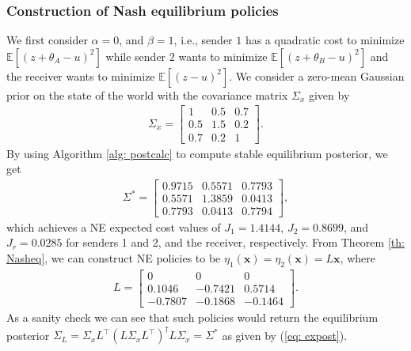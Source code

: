 \documentclass[12pt,journal,onecolumn]{IEEEtran}
\begin{document}
\subsubsection{Construction of Nash equilibrium policies}
We first consider $\alpha=0$, and $\beta=1$, i.e., sender $1$ has a quadratic cost to minimize $\mathbb{E}[(z+\theta_A-u)^2]$ while sender $2$ wants to minimize $\mathbb{E}[(z+\theta_B-u)^2]$ and the receiver wants to minimize $\mathbb{E}[(z-u)^2]$. We consider a zero-mean Gaussian prior on the state of the world with the covariance matrix $\Sigma_x$ given by
\begin{align}
    \Sigma_x=\begin{bmatrix}1 &0.5 &0.7\\0.5 &1.5 &0.2\\ 0.7 &0.2 &1\end{bmatrix}.
\end{align}
By using Algorithm \ref{alg: postcalc} to compute stable equilibrium posterior, we get 
\begin{align}\label{eq: expost}
\Sigma^*=\begin{bmatrix}
    0.9715  &  0.5571 &   0.7793\\
    0.5571  &  1.3859    &0.0413\\
    0.7793  &  0.0413   & 0.7794
   \end{bmatrix},
\end{align}
which achieves a NE expected cost values of $J_1=1.4144$, $J_2=0.8699$, and $ J_r=0.0285$ for senders 1 and 2, and the receiver, respectively. 
From Theorem \ref{th: Nasheq}, we can construct NE policies to be $\eta_1(\boldsymbol{x})=\eta_2(\boldsymbol{x})=L\boldsymbol{x}$, where 
\begin{align*}
L=\begin{bmatrix}
   0&   0  &  0\\
    0.1046&   -0.7421   & 0.5714\\
   -0.7807  & -0.1868 &  -0.1464
\end{bmatrix} .  
\end{align*}
As a sanity check we can see that such policies would return the equilibrium posterior $\Sigma_L=\Sigma_xL^\top(L\Sigma_x L^\top)^{\dagger}L\Sigma_x=\Sigma^*$ as given by (\ref{eq: expost}). 
\end{document}
